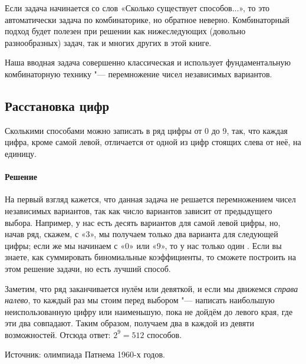 \documentclass[twoside]{book}
\makeatletter
\newcommand{\rindex}[2][\imki@jobname]{%
  \index[#1]{\detokenize{#2}}%
}
\makeatother
\begin{document}
 
 
Если задача начинается со слов «Сколько существует способов...», то это автоматически задача по комбинаторике, но обратное неверно.
Комбинаторный подход будет полезен при решении как нижеследующих (довольно разнообразных) задач, так и многих других в этой книге.

Наша вводная задача совершенно классическая и использует фундаментальную
комбинаторную технику "--- перемножение чисел независимых вариантов.

\subsection*{Расстановка цифр}%
\rindex{Расстановка цифр}

Сколькими способами можно записать в ряд цифры от 0 до 9, так, что каждая цифра, кроме самой левой, отличается от одной из цифр стоящих слева от неё, на единицу.

\paragraph{Решение} На первый взгляд кажется, что данная задача не
решается перемножением чисел независимых вариантов, так как число
вариантов зависит от предыдущего выбора.
Например, у нас есть десять вариантов для самой левой цифры, но, начав ряд, скажем, с «3», мы получаем только два варианта для следующей цифры;
если же мы начинаем с «0» или «9», то у нас только один .
Если вы знаете, как суммировать биномиальные коэффициенты, то сможете построить на этом решение задачи, но есть лучший способ.

Заметим, что ряд заканчивается нулём или девяткой, и если
мы движемся \emph{справа налево}, то каждый раз мы стоим перед выбором
"--- написать наибольшую неиспользованную цифру или наименьшую, пока
не дойдём до левого края, где эти два 
совпадают.
Таким образом, получаем два 
в каждой из девяти
возможностей.
Отсюда ответ: $2^9=512$ способов.\heart

\medskip
{\small
  
Источник: олимпиада Патнема 1960-х годов.


}
\medskip
\end{document}

